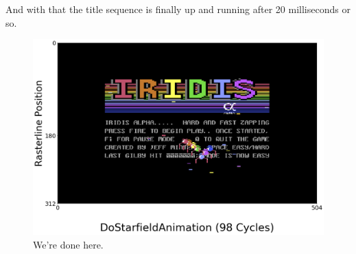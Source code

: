 And with that the title sequence is finally up and running after 20 milliseconds or so.

\begin{figure}[H]
    \centering
      \includegraphics[width=12cm]{titlescreen/title89.png}%
\caption{We're done here.}
\end{figure}
